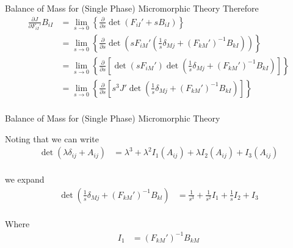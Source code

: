 \documentclass[11pt]{beamer}
\begin{document}
\begin{frame}{Balance of Mass for (Single Phase) Micromorphic Theory}
Therefore
\begin{align*}
\frac{\partial J}{\partial F_{iI}'}B_{iI} &= \lim_{s \to 0} \left\{\frac{\partial}{\partial s}\det\left(F_{iI}' + s B_{iI}\right)\right\}\\
&= \lim_{s \to 0} \left\{\frac{\partial}{\partial s}\det\left(s F_{iM}' \left(\frac{1}{s}\delta_{Mj} +  \left(F_{kM}'\right)^{-1} B_{kI}\right)\right)\right\}\\
&= \lim_{s \to 0} \left\{\frac{\partial}{\partial s}\left[\det \left(s F_{iM}'\right) \det \left(\frac{1}{s}\delta_{Mj} +  \left(F_{kM}'\right)^{-1} B_{kI}\right)\right]\right\}\\
&= \lim_{s \to 0} \left\{\frac{\partial}{\partial s}\left[s^3 J' \det \left(\frac{1}{s}\delta_{Mj} +  \left(F_{kM}'\right)^{-1} B_{kI}\right)\right]\right\}\\
\end{align*}

\end{frame}

\begin{frame}{Balance of Mass for (Single Phase) Micromorphic Theory}

Noting that we can write
\begin{align*}
\det \left( \lambda \delta_{ij} + A_{ij}\right) &= \lambda^3 + \lambda^2 I_1\left(A_{ij}\right) + \lambda I_2\left(A_{ij}\right) + I_3\left(A_{ij}\right)\\
\end{align*}

we expand
\begin{align*}
\det\left(\frac{1}{s} \delta_{Mj} + \left(F_{kM}'\right)^{-1} B_{kl} \right) &= \frac{1}{s^3} + \frac{1}{s^2} I_1 + \frac{1}{s} I_2 + I_3\\
\end{align*}

Where
\begin{align*}
I_1 &= \left(F_{kM}'\right)^{-1} B_{kM}\\
\end{align*}

\end{frame}
\end{document}
